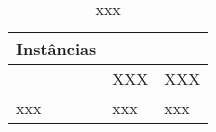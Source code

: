 \documentclass[]{article}
\title{}
\author{}
\begin{document}
\maketitle

\begin{abstract}

\end{abstract}

\section{}

	\begin{table}[h]
		\centering
				\begin{tabular}{lll}
					\hline
					\multicolumn{1}{l}{Instâncias} &  &   \\
					\hline
	
					& \multicolumn{1}{l}{XXX} & \multicolumn{1}{l}{XXX} \\\hline
					\ttfamily xxx & \ttfamily xxx & \ttfamily xxx \\                \hline
				\end{tabular}
			\caption{xxx}
			\label{tab:xxx}
		\end{table}
	
\end{document}
